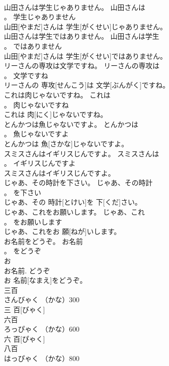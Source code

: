 \documentclass[8pt]{extreport}
\begin{document}
\begin{CJK}{UTF8}{min}
\\	山田さんは学生じゃありません。	山田さんは
\\	。	学生じゃありません	
\\	山田[やまだ]さんは 学生[がくせい]じゃありません。	
\\	山田さんは学生ではありません。	山田さんは学生
\\	。	ではありません	
\\	山田[やまだ]さんは 学生[がくせい]ではありません。	
\\	リーさんの専攻は文学ですね。	リーさんの専攻は
\\	。	文学ですね	
\\	リーさんの 専攻[せんこう]は 文学[ぶんがく]ですね。	
\\	これは肉じゃないですね。	これは
\\	。	肉じゃないですね	
\\	これは 肉[にく]じゃないですね。	
\\	とんかつは魚じゃないですよ。	とんかつは
\\	。	魚じゃないですよ	
\\	とんかつは 魚[さかな]じゃないですよ。	
\\	スミスさんはイギリスじんですよ。	スミスさんは
\\	。	イギリスじんですよ	
\\	スミスさんはイギリスじんですよ。	
\\	じゃあ、その時計を下さい。	じゃあ、その時計
\\	。	を下さい	
\\	じゃあ、その 時計[とけい]を 下[くだ]さい。	
\\	じゃあ、これをお願いします。	じゃあ、これ
\\	。	をお願いします	
\\	じゃあ、これをお 願[ねが]いします。	
\\	お名前をどうぞ。	お名前
\\	。	をどうぞ	
\\	お 
\\	お名前. どうぞ 
\\	お 名前[なまえ]をどうぞ。	
\\	三百	
\\	さんびゃく	（かな）300	
\\	三 百[びゃく]	
\\	六百	
\\	ろっぴゃく	（かな）600	
\\	六 百[ぴゃく]	
\\	八百	
\\	はっぴゃく	（かな）800	

\end{CJK}
\end{document}
